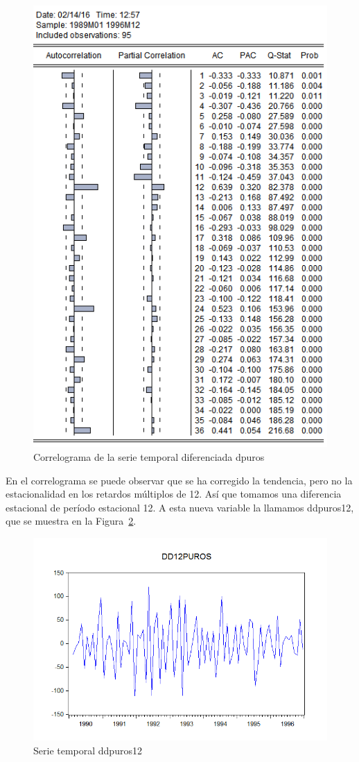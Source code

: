 \documentclass[12pt,a4paper,twoside,openright,titlepage,final]{article}
\begin{document}
\begin{figure}[tbph!]
	\centering
	\includegraphics[width=0.8\linewidth]{imagenes/puros/correlograma-puros-diferenciada.png}
	\caption{Correlograma de la serie temporal diferenciada dpuros}
	\label{fig:correlograma-puros-diferenciada}
\end{figure}

En el correlograma se puede observar que se ha corregido la tendencia, pero no la estacionalidad en los retardos múltiplos de 12. Así que tomamos una diferencia estacional de período estacional 12. A esta nueva variable la llamamos ddpuros12, que se muestra en la Figura~\ref{fig:puros-diferenciada-estacional12}.\\

\begin{figure}[tbph!]
	\centering
	\includegraphics[width=0.8\linewidth]{imagenes/puros/puros-diferenciada-estacional12.png}
	\caption{Serie temporal ddpuros12}
	\label{fig:puros-diferenciada-estacional12}
\end{figure}
\end{document}
